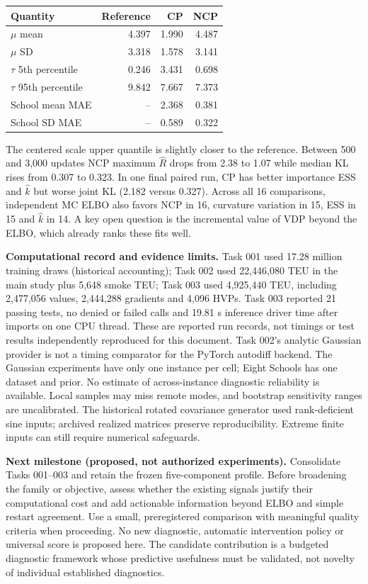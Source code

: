 \documentclass[11pt,a4paper]{article}
\begin{document}
\begin{center}\small
\begin{tabular}{lrrr}\toprule Quantity & Reference & CP & NCP\\\midrule
$\mu$ mean &4.397&1.990&4.487\\
$\mu$ SD &3.318&1.578&3.141\\
$\tau$ 5th percentile &0.246&3.431&0.698\\
$\tau$ 95th percentile &9.842&7.667&7.373\\
School mean MAE &--&2.368&0.381\\
School SD MAE &--&0.589&0.322\\\bottomrule\end{tabular}
\end{center}
The centered scale upper quantile is slightly closer to the reference. Between 500 and 3,000 updates NCP maximum $\hat R$ drops from 2.38 to 1.07 while median KL rises from 0.307 to 0.323. In one final paired run, CP has better importance ESS and $\hat k$ but worse joint KL (2.182 versus 0.327). Across all 16 comparisons, independent MC ELBO also favors NCP in 16, curvature variation in 15, ESS in 15 and $\hat k$ in 14. A key open question is the incremental value of VDP beyond the ELBO, which already ranks these fits well.

\textbf{Computational record and evidence limits.} Task 001 used 17.28 million training draws (historical accounting); Task 002 used 22,446,080 TEU in the main study plus 5,648 smoke TEU; Task 003 used 4,925,440 TEU, including 2,477,056 values, 2,444,288 gradients and 4,096 HVPs. Task 003 reported 21 passing tests, no denied or failed calls and 19.81 s inference driver time after imports on one CPU thread. These are reported run records, not timings or test results independently reproduced for this document. Task 002's analytic Gaussian provider is not a timing comparator for the PyTorch autodiff backend. The Gaussian experiments have only one instance per cell; Eight Schools has one dataset and prior. No estimate of across-instance diagnostic reliability is available. Local samples may miss remote modes, and bootstrap sensitivity ranges are uncalibrated. The historical rotated covariance generator used rank-deficient sine inputs; archived realized matrices preserve reproducibility. Extreme finite inputs can still require numerical safeguards.

\textbf{Next milestone (proposed, not authorized experiments).} Consolidate Tasks 001--003 and retain the frozen five-component profile. Before broadening the family or objective, assess whether the existing signals justify their computational cost and add actionable information beyond ELBO and simple restart agreement. Use a small, preregistered comparison with meaningful quality criteria when proceeding. No new diagnostic, automatic intervention policy or universal score is proposed here. The candidate contribution is a budgeted diagnostic framework whose predictive usefulness must be validated, not novelty of individual established diagnostics.
\end{document}
